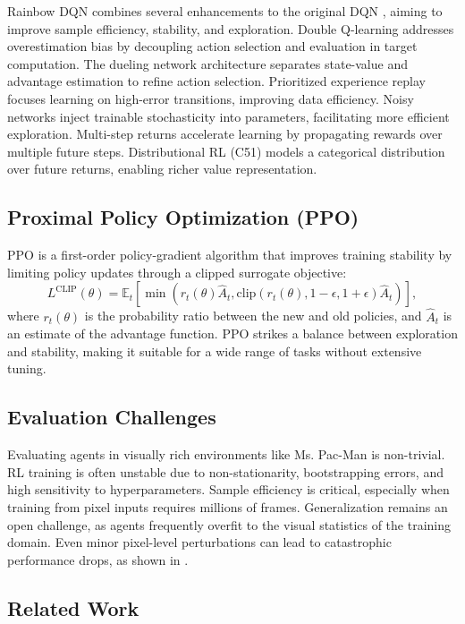 \documentclass{article}
\begin{document}
Rainbow DQN \cite{hessel2018rainbow} combines several enhancements to the original DQN \cite{mnih2015human}, aiming to improve sample efficiency, stability, and exploration. Double Q-learning addresses overestimation bias by decoupling action selection and evaluation in target computation. The dueling network architecture separates state-value and advantage estimation to refine action selection. Prioritized experience replay focuses learning on high-error transitions, improving data efficiency. Noisy networks inject trainable stochasticity into parameters, facilitating more efficient exploration. Multi-step returns accelerate learning by propagating rewards over multiple future steps. Distributional RL (C51) models a categorical distribution over future returns, enabling richer value representation.

\subsection{Proximal Policy Optimization (PPO)}

PPO \cite{schulman2017proximal} is a first-order policy-gradient algorithm that improves training stability by limiting policy updates through a clipped surrogate objective:
\[
L^{\text{CLIP}}(\theta) = \mathbb{E}_t \left[ \min \left( r_t(\theta) \hat{A}_t, \text{clip}(r_t(\theta), 1 - \epsilon, 1 + \epsilon) \hat{A}_t \right) \right],
\]
where $r_t(\theta)$ is the probability ratio between the new and old policies, and $\hat{A}_t$ is an estimate of the advantage function. PPO strikes a balance between exploration and stability, making it suitable for a wide range of tasks without extensive tuning.

\subsection{Evaluation Challenges}

Evaluating agents in visually rich environments like Ms. Pac-Man is non-trivial. RL training is often unstable due to non-stationarity, bootstrapping errors, and high sensitivity to hyperparameters. Sample efficiency is critical, especially when training from pixel inputs requires millions of frames. Generalization remains an open challenge, as agents frequently overfit to the visual statistics of the training domain. Even minor pixel-level perturbations can lead to catastrophic performance drops, as shown in \cite{zhang2020investigation}.

\subsection{Related Work}
\end{document}
